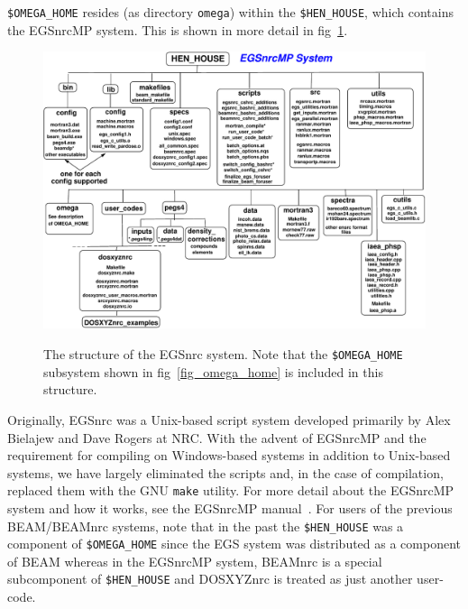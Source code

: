 \documentclass[12pt,twoside]{article}
\begin{document}
{\tt \$OMEGA\_HOME} resides (as directory {\tt omega})
within the {\tt \$HEN\_HOUSE}, which contains the EGSnrcMP system.
This is shown in more detail in fig~\ref{fig_hen_house}.
\begin{figure}[hbp]
\begin{center}
\leavevmode
\mbox{}
\hspace*{-1cm}
\includegraphics[width=19cm]{figures/hen_house}
\caption[Structure of EGSnrcMP directory, {\em i.e~} the {\tt \$HEN\_HOUSE}.]
{The structure of the
EGSnrc system. Note that the {\tt \$OMEGA\_HOME} subsystem shown in
fig~\ref{fig_omega_home} is included in this structure.
}
 
\label{fig_hen_house}
\end{center}
\end{figure}
Originally, EGSnrc was a Unix-based script system developed primarily by
Alex Bielajew and Dave Rogers at NRC.  With the advent of EGSnrcMP\cite{Ka03}
and the
requirement for compiling on Windows-based systems in addition to Unix-based
systems, we have largely eliminated the scripts and, in the case of
compilation, replaced them with the GNU {\tt make} utility.
For more detail about the EGSnrcMP system and how it works, see the
EGSnrcMP manual~\cite{Ka03}.  For users of the previous BEAM/BEAMnrc
systems, note that in the past the {\tt \$HEN\_HOUSE} was a component of
{\tt \$OMEGA\_HOME} since the EGS system was distributed as a component of
BEAM whereas in the EGSnrcMP system, BEAMnrc is  a special subcomponent of
{\tt \$HEN\_HOUSE} and DOSXYZnrc is treated as just another user-code.
\end{document}
